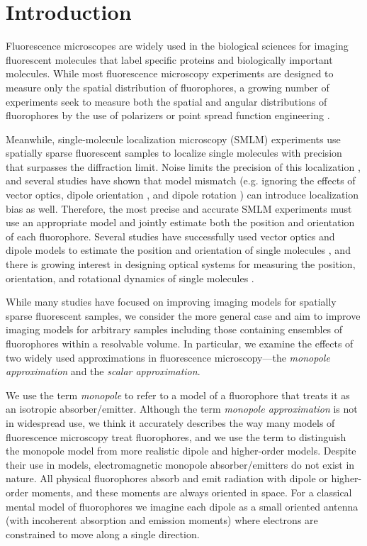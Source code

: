 \documentclass[]{osa-article}
\begin{document}
\section{Introduction}
Fluorescence microscopes are widely used in the biological sciences for imaging
fluorescent molecules that label specific proteins and biologically important
molecules. While most fluorescence microscopy experiments are designed to
measure only the spatial distribution of fluorophores, a growing number of
experiments seek to measure both the spatial and angular distributions of
fluorophores by the use of polarizers \cite{vrabioiu2006, mattheyses2010,
  mehta2016, mcquilken2017, zhanghao2017} or point spread function engineering
\cite{agrawal2012, zhang2018}.

Meanwhile, single-molecule localization microscopy (SMLM) experiments use
spatially sparse fluorescent samples to localize single molecules with precision
that surpasses the diffraction limit. Noise limits the precision of this
localization \cite{foreman2011, chao2016}, and several studies have shown that
model mismatch (e.g. ignoring the effects of vector optics, dipole orientation
\cite{backlund2014}, and dipole rotation \cite{lew2013}) can introduce
localization bias as well. Therefore, the most precise and accurate SMLM
experiments must use an appropriate model and jointly estimate both the position
and orientation of each fluorophore. Several studies have successfully used
vector optics and dipole models to estimate the position and orientation of
single molecules \cite{bohmer2003, lieb2004, toprak2006, aguet2009,
  mortensen2010}, and there is growing interest in designing optical systems for
measuring the position, orientation, and rotational dynamics of single molecules
\cite{agrawal2012, backer2014, stallinga2015, zhang2018, zhang2018-2}.

While many studies have focused on improving imaging models for spatially sparse
fluorescent samples, we consider the more general case and aim to improve
imaging models for arbitrary samples including those containing ensembles of
fluorophores within a resolvable volume. In particular, we examine the effects
of two widely used approximations in fluorescence microscopy---the
\textit{monopole approximation} and the \textit{scalar approximation}.

We use the term \textit{monopole} to refer to a model of a fluorophore that
treats it as an isotropic absorber/emitter. Although the term \textit{monopole
  approximation} is not in widespread use, we think it accurately describes the
way many models of fluorescence microscopy treat fluorophores, and we use the
term to distinguish the monopole model from more realistic dipole and
higher-order models. Despite their use in models, electromagnetic monopole
absorber/emitters do not exist in nature. All physical fluorophores absorb and
emit radiation with dipole or higher-order moments, and these moments are always
oriented in space. For a classical mental model of fluorophores we imagine each
dipole as a small oriented antenna (with incoherent absorption and emission
moments) where electrons are constrained to move along a single direction. 
\end{document}
